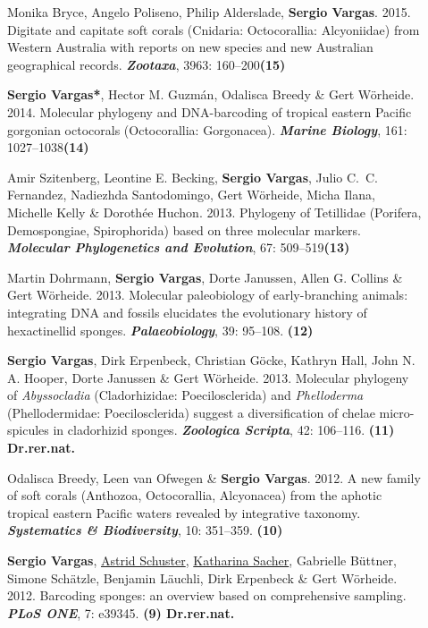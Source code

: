 \documentclass[letter,10pt]{article}
\begin{document}
\begin{description}
\item[]Monika Bryce, Angelo Poliseno, Philip Alderslade, \textbf{Sergio Vargas}. 2015. Digitate and capitate soft corals (Cnidaria: Octocorallia: Alcyoniidae) from Western Australia with reports on new species and new Australian geographical records. \textbf{\emph{Zootaxa}}, 3963: 160--200\hfill\textbf{{\scriptsize (15)}}

\item[]\textbf{Sergio Vargas*}, Hector M. Guzm\'an, Odalisca Breedy \& Gert W\"orheide. 2014. Molecular phylogeny and DNA-barcoding of tropical eastern Pacific gorgonian octocorals (Octocorallia: Gorgonacea). \textbf{\emph{Marine Biology}}, 161: 1027--1038\hfill\textbf{{\scriptsize (14)}}

\item[]Amir Szitenberg, Leontine E. Becking, \textbf{Sergio Vargas}, Julio C.~C. Fernandez, Nadiezhda Santodo\-mingo, Gert W\"orheide, Micha Ilana, Michelle Kelly \& Doroth\'ee Huchon. 2013. Phylogeny of Tetillidae (Porifera, Demospongiae, Spirophorida) based on three molecular markers. \textbf{\emph{Molecular Phylogenetics and Evolution}}, 67: 509--519\hfill\textbf{{\scriptsize (13)}}

\item[]Martin Dohrmann, \textbf{Sergio Vargas}, Dorte Janussen, Allen G. Collins \& Gert W\"orheide. 2013. Molecular paleobiology of early-branching animals: integrating DNA and fossils elucidates the evolutionary history of hexactinellid sponges. \textbf{\emph{Palaeobiology}}, 39: 95--108. \hfill\textbf{{\scriptsize (12)}}

\item[]\textbf{Sergio Vargas}, Dirk Erpenbeck, Christian G\"ocke, Kathryn Hall, John N. A. Hooper, Dorte Janussen \& Gert W\"orheide. 2013. Molecular phylogeny of \emph{Abyssocladia} (Cladorhizidae: Poecilosclerida) and \emph{Phelloderma} (Phellodermidae: Poecilosclerida) suggest a diversification of chelae micro-spicules in cladorhizid sponges. \textbf{\emph{Zoologica Scripta}}, 42: 106--116. \hfill\textbf{{\scriptsize (11) Dr.rer.nat.}}

\item[]Odalisca Breedy, Leen van Ofwegen \& \textbf{Sergio Vargas}. 2012. A new family of soft corals (Anthozoa, Octocorallia, Alcyonacea) from the aphotic tropical eastern Pacific waters revealed by integrative taxonomy. \textbf{\emph{Systematics \& Biodiversity}}, 10: 351--359. \hfill\textbf{{\scriptsize (10)}}

\item[]\textbf{Sergio Vargas}, \underline{Astrid Schuster}, \underline{Katharina Sacher}, Gabrielle B\"uttner, Simone Sch\"atzle, Benjamin L\"auchli, Dirk Erpenbeck \& Gert W\"orheide. 2012. Barcoding sponges: an overview based on comprehensive sampling. \textbf{\emph{PLoS ONE}}, 7: e39345. \hfill\textbf{{\scriptsize (9) Dr.rer.nat.}}


\end{description}
\end{document}
